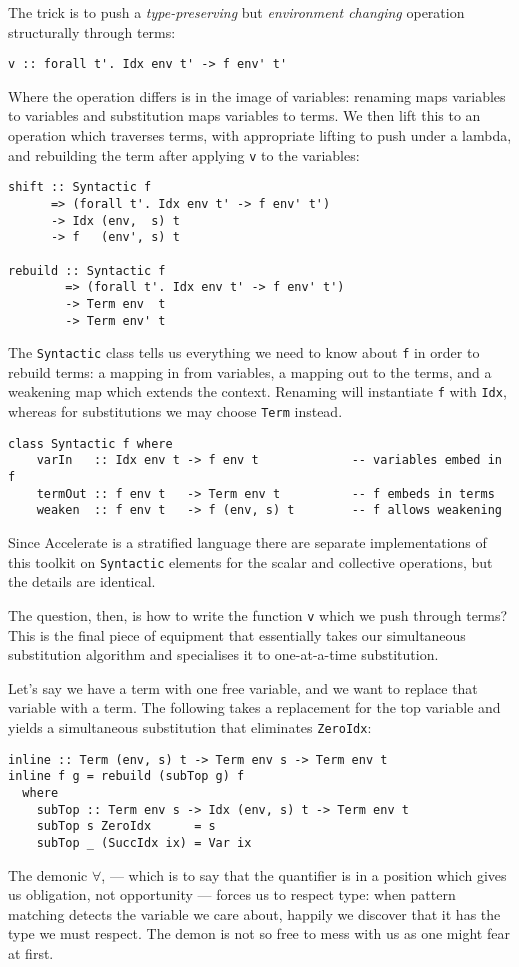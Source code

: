 The trick is to push a \emph{type-preserving} but \emph{environment changing}
operation structurally through terms:
%
\begin{lstlisting}[style=haskell]
v :: forall t'. Idx env t' -> f env' t'
\end{lstlisting}
%
Where the operation differs is in the image of variables: renaming maps
variables to variables and substitution maps variables to terms. We then lift
this to an operation which traverses terms, with appropriate lifting to push
under a lambda, and rebuilding the term after applying \texttt{v} to the
variables:
%
\begin{lstlisting}[style=haskell,mathescape]
shift :: Syntactic f
      => (forall t'. Idx env t' -> f env' t')
      -> Idx (env,  s) t
      -> f   (env', s) t

rebuild :: Syntactic f
        => (forall t'. Idx env t' -> f env' t')
        -> Term env  t
        -> Term env' t
\end{lstlisting}
%
The \texttt{Syntactic} class tells us everything we need to know about
\texttt{f} in order to rebuild terms: a mapping in from variables, a mapping out
to the terms, and a weakening map which extends the context. Renaming will
instantiate \texttt{f} with \texttt{Idx}, whereas for substitutions we may
choose \texttt{Term} instead.
%
\begin{lstlisting}[style=haskell]
class Syntactic f where
    varIn   :: Idx env t -> f env t             -- variables embed in f
    termOut :: f env t   -> Term env t          -- f embeds in terms
    weaken  :: f env t   -> f (env, s) t        -- f allows weakening
\end{lstlisting}
%
Since Accelerate is a stratified language there are separate implementations of
this toolkit on \texttt{Syntactic} elements for the scalar and collective
operations, but the details are identical.

The question, then, is how to write the function \texttt{v} which we push
through terms? This is the final piece of equipment that essentially takes our
simultaneous substitution algorithm and specialises it to one-at-a-time
substitution.

Let's say we have a term with one free variable, and we want to replace that
variable with a term. The following takes a replacement for the top variable and
yields a simultaneous substitution that eliminates \texttt{ZeroIdx}:
%
\begin{lstlisting}[style=haskell,caption={Simultaneous substitution to inline terms}]
inline :: Term (env, s) t -> Term env s -> Term env t
inline f g = rebuild (subTop g) f
  where
    subTop :: Term env s -> Idx (env, s) t -> Term env t
    subTop s ZeroIdx      = s
    subTop _ (SuccIdx ix) = Var ix
\end{lstlisting}
%
The demonic $\forall$, --- which is to say that the quantifier is in a position
which gives us obligation, not opportunity --- forces us to respect type: when
pattern matching detects the variable we care about, happily we discover that it
has the type we must respect. The demon is not so free to mess with us as one
might fear at first.

